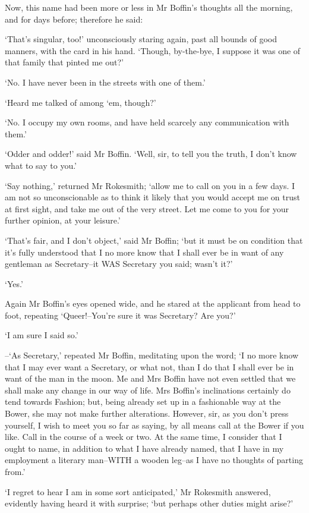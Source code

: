 Now, this name had been more or less in Mr Boffin’s thoughts all the
morning, and for days before; therefore he said:

‘That’s singular, too!’ unconsciously staring again, past all bounds of
good manners, with the card in his hand. ‘Though, by-the-bye, I suppose
it was one of that family that pinted me out?’

‘No. I have never been in the streets with one of them.’

‘Heard me talked of among ‘em, though?’

‘No. I occupy my own rooms, and have held scarcely any communication
with them.’

‘Odder and odder!’ said Mr Boffin. ‘Well, sir, to tell you the truth, I
don’t know what to say to you.’

‘Say nothing,’ returned Mr Rokesmith; ‘allow me to call on you in a few
days. I am not so unconscionable as to think it likely that you would
accept me on trust at first sight, and take me out of the very street.
Let me come to you for your further opinion, at your leisure.’

‘That’s fair, and I don’t object,’ said Mr Boffin; ‘but it must be on
condition that it’s fully understood that I no more know that I shall
ever be in want of any gentleman as Secretary--it WAS Secretary you
said; wasn’t it?’

‘Yes.’

Again Mr Boffin’s eyes opened wide, and he stared at the applicant from
head to foot, repeating ‘Queer!--You’re sure it was Secretary? Are you?’

‘I am sure I said so.’

--‘As Secretary,’ repeated Mr Boffin, meditating upon the word; ‘I no
more know that I may ever want a Secretary, or what not, than I do that
I shall ever be in want of the man in the moon. Me and Mrs Boffin have
not even settled that we shall make any change in our way of life. Mrs
Boffin’s inclinations certainly do tend towards Fashion; but, being
already set up in a fashionable way at the Bower, she may not make
further alterations. However, sir, as you don’t press yourself, I wish
to meet you so far as saying, by all means call at the Bower if you
like. Call in the course of a week or two. At the same time, I consider
that I ought to name, in addition to what I have already named, that I
have in my employment a literary man--WITH a wooden leg--as I have no
thoughts of parting from.’

‘I regret to hear I am in some sort anticipated,’ Mr Rokesmith answered,
evidently having heard it with surprise; ‘but perhaps other duties might
arise?’

